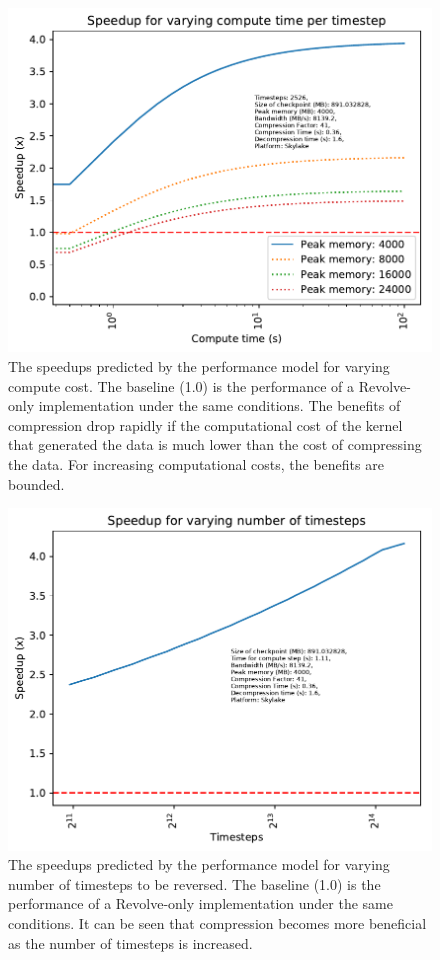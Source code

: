 \documentclass[conference]{IEEEtran}
\begin{document}
\begin{figure}
\begin{center}
\includegraphics[width=\linewidth]{images/varying-compute.pdf}
\end{center}
\caption{The speedups predicted by the performance model for varying
  compute cost. The baseline
(1.0) is the performance of a Revolve-only implementation under the
same conditions. The benefits of compression drop rapidly if the
computational cost of the kernel that generated the data is much lower
than the cost of compressing the data. For increasing computational
costs, the benefits are bounded.}
\label{fig:varying_compute}
\end{figure}

\begin{figure}
\begin{center}
\includegraphics[width=\linewidth]{images/varying-nt.pdf}
\end{center}
\caption{The speedups predicted by the performance model for varying
  number of timesteps to be reversed. The baseline
(1.0) is the performance of a Revolve-only implementation under the
same conditions. It can be seen that compression becomes more
beneficial as the number of timesteps is increased.}
\label{fig:varying_nt}
\end{figure}
\end{document}
